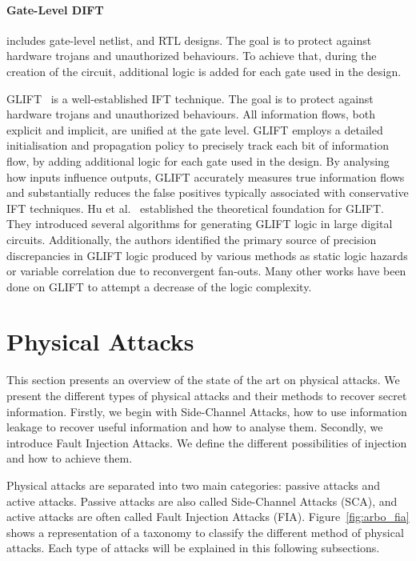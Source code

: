 \paragraph{Gate-Level DIFT} includes gate-level netlist, and RTL designs. The goal is to protect against hardware trojans and unauthorized behaviours. To achieve that, during the creation of the circuit, additional logic is added for each gate used in the design.

GLIFT~\cite{TWMMCS-09-asplos} is a well-established IFT technique. The goal is to protect against hardware trojans and unauthorized behaviours. All information flows, both explicit and implicit, are unified at the gate level. GLIFT employs a detailed initialisation and propagation policy to precisely track each bit of information flow, by adding additional logic for each gate used in the design. By analysing how inputs influence outputs, GLIFT accurately measures true information flows and substantially reduces the false positives typically associated with conservative IFT techniques.
Hu et al.~\cite{HOITSMK-11-tcad} established the theoretical foundation for GLIFT. They introduced several algorithms for generating GLIFT logic in large digital circuits. Additionally, the authors identified the primary source of precision discrepancies in GLIFT logic produced by various methods as static logic hazards or variable correlation due to reconvergent fan-outs. Many other works have been done on GLIFT to attempt a decrease of the logic complexity.

\section{Physical Attacks}
\label{section:physicalAttacks}

This section presents an overview of the state of the art on physical attacks. We present the different types of physical attacks and their methods to recover secret information. Firstly, we begin with Side-Channel Attacks, how to use information leakage to recover useful information and how to analyse them.
Secondly, we introduce Fault Injection Attacks. We define the different possibilities of injection and how to achieve them.

Physical attacks are separated into two main categories: passive attacks and active attacks. Passive attacks are also called Side-Channel Attacks (SCA), and active attacks are often called Fault Injection Attacks (FIA). Figure~\ref{fig:arbo_fia} shows a representation of a taxonomy to classify the different method of physical attacks. Each type of attacks will be explained in this following subsections.

